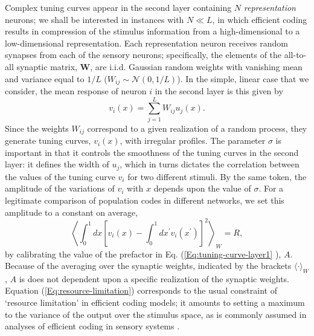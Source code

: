 \documentclass[a4paper]{article}%
\begin{document}
Complex tuning curves appear in the second layer containing $N$
\textit{representation} neurons; we shall be interested in instances with
$N\ll L$, in which efficient coding results in compression of the stimulus
information from a high-dimensional to a low-dimensional representation. Each
representation neuron receives random synapses from each of the sensory
neurons; specifically, the elements of the all-to-all synaptic matrix,
$\mathbf{W}$, are i.i.d. Gaussian random weights with vanishing mean and
variance equal to $1/L$ ($W_{ij}\sim\mathcal{N}\left(  0,1/L\right)  $). In
the simple, linear case that we consider, the mean response of neuron $i$ in
the second layer is this given by
\begin{equation}
v_{i}\left(  x\right)  =\sum_{j=1}^{L}W_{ij}u_{j}\left(  x\right)  .
\label{Eq:tuning-curve-layer2}%
\end{equation}
Since the weights $W_{ij}$ correspond to a given realization of a random
process, they generate tuning curves, $v_{i}\left(  x\right)  $, with
irregular profiles. The parameter $\sigma$ is important in that it controls
the smoothness of the tuning curves in the second layer: it defines the width
of $u_{j}$, which in turns dictates the correlation between the values of the
tuning curve $v_{i}$ for two different stimuli. By the same token, the
amplitude of the variations of $v_{i}$ with $x$ depends upon the value of
$\sigma$. For a legitimate comparison of population codes in different
networks, we set this amplitude to a constant on average,
\begin{equation}
\left\langle \int_{0}^{1}dx\left[  v_{i}\left(  x\right)  -\int_{0}%
^{1}dx^{\prime}v_{i}\left(  x^{\prime}\right)  \right]  ^{2}\right\rangle
_{W}=R, \label{Eq:resource-limitation}%
\end{equation}
by calibrating the value of the prefactor in Eq. (\ref{Eq:tuning-curve-layer1}%
), $A$. Because of the averaging over the synaptic weights, indicated by the
brackets $\langle\cdot\rangle_{W}$, $A$ is does not dependent upon a specific
realization of the synaptic weights. Equation (\ref{Eq:resource-limitation})
corresponds to the usual constraint of `resource limitation' in efficient
coding models; it amounts to setting a maximum to the variance of the output
over the stimulus space, as is commonly assumed in analyses of efficient
coding in sensory systems
\cite{Atick1990TowardsProcessing,VanHateren1998IndependentCortex,Doi2012EfficientRetina,Zhaoping2014UnderstandingData}%
.
\end{document}
